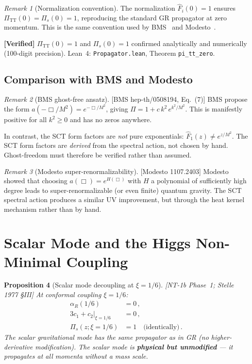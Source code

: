 \documentclass[12pt,a4paper]{article}
\newtheorem{proposition}{Proposition}[section]
\theoremstyle{definition}
\theoremstyle{remark}
\newtheorem{remark}[proposition]{Remark}
\newcommand{\fromlit}[1]{\textcolor{blue!70!black}{\textsf{[#1]}}}
\newcommand{\verified}[1]{%
  \par\smallskip\noindent
  \colorbox{green!10}{\parbox{\dimexpr\linewidth-2\fboxsep}{%
    \textcolor{green!50!black}{\textbf{[Verified]}} #1}}%
  \par\smallskip}
\begin{document}
\begin{remark}[Normalization convention]
\label{rem:normalization}
The normalization $\hat{F}_i(0) = 1$ ensures
$\Pi_{\mathrm{TT}}(0) = \Pi_s(0) = 1$, reproducing
the standard GR propagator at zero momentum.
This is the same convention used by BMS~\cite{BMS2006}
and Modesto~\cite{Modesto2012}.
\end{remark}

\verified{$\Pi_{\text{TT}}(0) = 1$ and $\Pi_s(0) = 1$ confirmed
analytically and numerically (100-digit precision).
Lean~4: \texttt{Propagator.lean}, Theorem \texttt{pi\_tt\_zero}.}


\subsection{Comparison with BMS and Modesto}

\begin{remark}[BMS ghost-free ansatz]
\fromlit{BMS hep-th/0508194, Eq.~(7)}
BMS propose the form $a(-\Box/M^2) = e^{-\Box/M^2}$, giving
$\Pi = 1 + c\, k^2\, e^{k^2/M^2}$.  This is manifestly positive
for all $k^2 \geq 0$ and has no zeros anywhere.

In contrast, the SCT form factors are \emph{not} pure exponentials:
$\hat{F}_1(z) \neq e^{z/M^2}$.  The SCT form factors are
\emph{derived} from the spectral action, not chosen by hand.
Ghost-freedom must therefore be verified rather than assumed.
\end{remark}

\begin{remark}[Modesto super-renormalizability]
\fromlit{Modesto 1107.2403}
Modesto showed that choosing $a(\Box) = e^{H(\Box)}$ with $H$
a polynomial of sufficiently high degree leads to
super-renormalizable (or even finite) quantum gravity.  The SCT
spectral action produces a similar UV improvement, but through
the heat kernel mechanism rather than by hand.
\end{remark}


\section{Scalar Mode and the Higgs Non-Minimal Coupling}
\label{sec:scalar-mode}

\begin{proposition}[Scalar mode decoupling at $\xi = 1/6$]
\label{prop:scalar-decoupling}
\fromlit{NT-1b Phase~1; Stelle 1977 \S III}
At conformal coupling $\xi = 1/6$:
\begin{align}
  \alpha_R(1/6) &= 0\,,\\
  3c_1 + c_2\big|_{\xi=1/6} &= 0\,,\\
  \Pi_s(z;\xi=1/6) &= 1 \quad\text{(identically)}\,.
\end{align}
The scalar gravitational mode has the same propagator as in GR
(no higher-derivative modification).  The scalar mode is
\textbf{physical but unmodified} --- it propagates at all momenta
without a mass scale.
\end{proposition}
\end{document}
